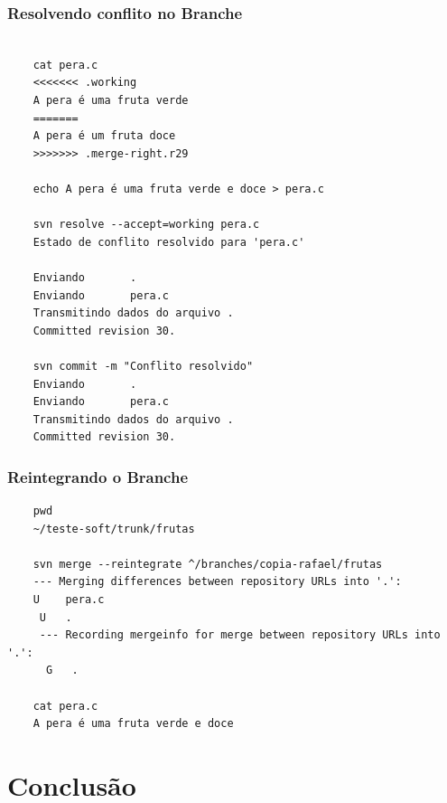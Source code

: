 \documentclass{beamer}
\begin{document}
\begin{frame}[fragile]
    \frametitle{Resolvendo conflito no Branche}

    \begin{bash}{}
    {\tiny
    \begin{verbatim}

    cat pera.c
    <<<<<<< .working
    A pera é uma fruta verde
    =======
    A pera é um fruta doce
    >>>>>>> .merge-right.r29

    echo A pera é uma fruta verde e doce > pera.c

    svn resolve --accept=working pera.c
    Estado de conflito resolvido para 'pera.c'

    Enviando       .
    Enviando       pera.c
    Transmitindo dados do arquivo .
    Committed revision 30.

    svn commit -m "Conflito resolvido"
    Enviando       .
    Enviando       pera.c
    Transmitindo dados do arquivo .
    Committed revision 30.
    \end{verbatim}
    }
    \end{bash}

\end{frame}
\begin{frame}[fragile]
    \frametitle{Reintegrando o Branche}

    \begin{bash}{}
    {\tiny
    \begin{verbatim}
    pwd
    ~/teste-soft/trunk/frutas
    
    svn merge --reintegrate ^/branches/copia-rafael/frutas
    --- Merging differences between repository URLs into '.':
    U    pera.c
     U   .
     --- Recording mergeinfo for merge between repository URLs into '.':
      G   .

    cat pera.c
    A pera é uma fruta verde e doce
    \end{verbatim}
    }
    \end{bash}

\end{frame}
\section{Conclus\~ao}
\end{document}
